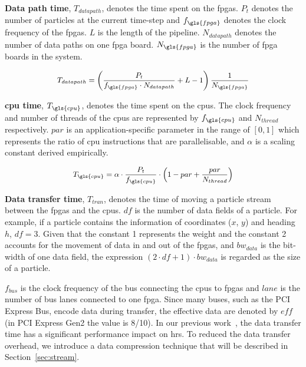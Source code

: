 \textbf{Data path time}, $T_{datapath}$, denotes the time spent on the \gls{fpga}s.
$P_t$ denotes the number of particles at the current time-step and $f_{\gls{fpga}}$ denotes the clock frequency of the \gls{fpga}s.
$L$ is the length of the pipeline.
$N_{datapath}$ denotes the number of data paths on one \gls{fpga} board.
$N_{\gls{fpga}}$ is the number of \gls{fpga} boards in the system.

\begin{equation}
\small
\begin{aligned}
T_{datapath} = \left(\frac{P_t}{f_{\gls{fpga}} \cdot N_{datapath}} + L - 1 \right) \frac{1}{N_{\gls{fpga}}}
\end{aligned}
\label{eqt:kernel}
\end{equation}

\textbf{\gls{cpu} time}, $T_{\gls{cpu}}$, denotes the time spent on the \gls{cpu}s.
The clock frequency and number of threads of the \gls{cpu}s are represented by $f_{\gls{cpu}}$ and $N_{thread}$ respectively.
$par$ is an application-specific parameter in the range of $[0,1]$ which represents the ratio of \gls{cpu} instructions that are parallelisable, and $\alpha$ is a scaling constant derived empirically.

\begin{equation}
\small
\begin{aligned}
T_{\gls{cpu}} = \alpha \cdot \frac{P_t}{f_{\gls{cpu}}} \cdot \left(1-par+\frac{par}{N_{thread}}\right)
\end{aligned}
\label{eqt:host}
\end{equation}

\textbf{Data transfer time}, $T_{tran}$, denotes the time of moving a particle stream between the \gls{fpga}s and the \gls{cpu}s.
$df$ is the number of data fields of a particle.
For example, if a particle contains the information of coordinates ($x$, $y$) and heading $h$, $df=3$.
Given that the constant 1 represents the weight and the constant 2 accounts for the movement of data in and out of the \gls{fpga}s,
and $bw_{data}$ is the bit-width of one data field, the expression $(2 \cdot df + 1) \cdot bw_{data}$ is regarded as the size of a particle.

$f_{bus}$ is the clock frequency of the bus connecting the \gls{cpu}s to \gls{fpga}s and $lane$ is the number of bus lanes connected to one \gls{fpga}.
Since many buses, such as the PCI Express Bus, encode data during transfer, the effective data are denoted by $eff$ (in PCI Express Gen2 the value is 8/10).
In our previous work~\cite{chau13a}, the data transfer time has a significant performance impact on \gls{hrs}.
To reduced the data transfer overhead, we introduce a data compression technique that will be described in Section~\ref{sec:stream}.

